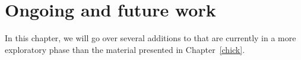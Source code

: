 \chapter{Ongoing and future work}

In this chapter, we will go over several additions to \Chick{} that are
currently in a more exploratory phase than the material presented in
Chapter~\ref{chick}.





%
